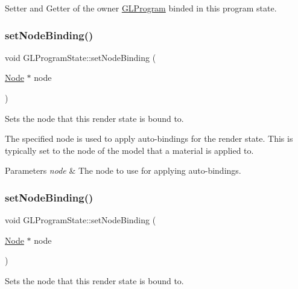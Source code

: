 Setter and Getter of the owner \hyperlink{classGLProgram}{G\+L\+Program} binded in this program state. \mbox{\label{classGLProgramState_a4d96305b053c642b99d4e97ea17f7f21}} 
\subsubsection{\texorpdfstring{set\+Node\+Binding()}{setNodeBinding()}\hspace{0.1cm}{\footnotesize\ttfamily [1/2]}}
{\footnotesize\ttfamily void G\+L\+Program\+State\+::set\+Node\+Binding (\begin{DoxyParamCaption}\item[{\hyperlink{classNode}{Node} $\ast$}]{node }\end{DoxyParamCaption})}

Sets the node that this render state is bound to.

The specified node is used to apply auto-\/bindings for the render state. This is typically set to the node of the model that a material is applied to.


\begin{DoxyParams}{Parameters}
{\em node} & The node to use for applying auto-\/bindings. \\
\hline
\end{DoxyParams}
\mbox{\label{classGLProgramState_a4d96305b053c642b99d4e97ea17f7f21}} 
\subsubsection{\texorpdfstring{set\+Node\+Binding()}{setNodeBinding()}\hspace{0.1cm}{\footnotesize\ttfamily [2/2]}}
{\footnotesize\ttfamily void G\+L\+Program\+State\+::set\+Node\+Binding (\begin{DoxyParamCaption}\item[{\hyperlink{classNode}{Node} $\ast$}]{node }\end{DoxyParamCaption})}

Sets the node that this render state is bound to.

